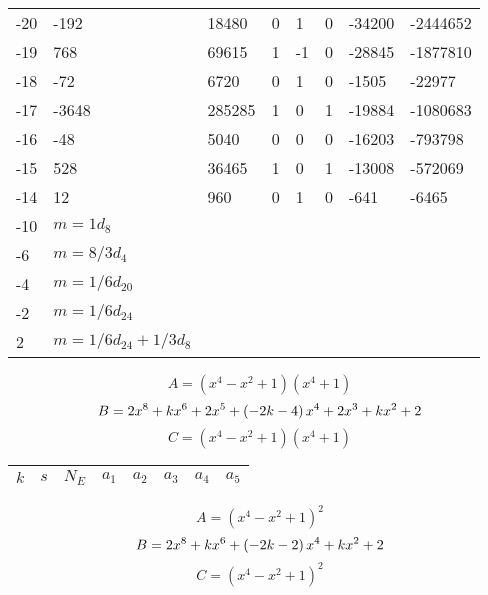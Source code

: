 \documentclass{amsart}
\begin{document}
\begin{longtable}{|l|l|l|lllll|}
-20&-192&18480&0&1&0&-34200&-2444652\\
-19&768&69615&1&-1&0&-28845&-1877810\\
-18&-72&6720&0&1&0&-1505&-22977\\
-17&-3648&285285&1&0&1&-19884&-1080683\\
-16&-48&5040&0&0&0&-16203&-793798\\
-15&528&36465&1&0&1&-13008&-572069\\
-14&12&960&0&1&0&-641&-6465\\
-10&$m=1d_{8}$&&\multicolumn{5}{c|}{}\\
-6&$m=8/3d_{4}$&&\multicolumn{5}{c|}{}\\
-4&$m=1/6d_{20}$&&\multicolumn{5}{c|}{}\\
-2&$m=1/6d_{24}$&&\multicolumn{5}{c|}{}\\
2&$m=1/6d_{24}+1/3d_{8}$&&\multicolumn{5}{c|}{}\\
\hline
\end{longtable}
$$A=(x^4
 - x^2
 + 1)(x^4
 + 1)$$
$$B=2\*x^8
 + k\*x^6
 + 2\*x^5
 + \left(-2\*k
 - 4\right) \*x^4
 + 2\*x^3
 + k\*x^2
 + 2$$
$$C=(x^4
 - x^2
 + 1)(x^4
 + 1)$$
\begin{longtable}{|l|l|l|lllll|}
\hline
$k$ & $s$ & $N_E$ & $a_1$ & $a_2$ & $a_3$ & $a_4$ & $a_5$\\
\hline
\hline
\end{longtable}
$$A=(x^4
 - x^2
 + 1)^{2}$$
$$B=2\*x^8
 + k\*x^6
 + \left(-2\*k
 - 2\right) \*x^4
 + k\*x^2
 + 2$$
$$C=(x^4
 - x^2
 + 1)^{2}$$
\end{document}
